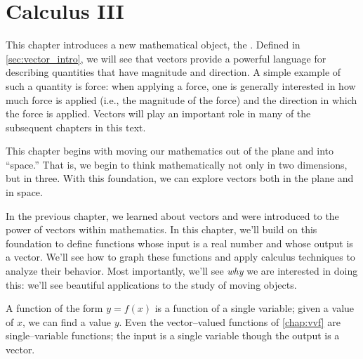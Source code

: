 \part{Calculus III}



This chapter introduces a new mathematical object, the . Defined in \autoref{sec:vector_intro}, we will see that vectors provide a powerful language for describing quantities that have magnitude and direction. A simple example of such a quantity is force: when applying a force, one is generally interested in how much force is applied (i.e., the magnitude of the force) and the direction in which the force is applied. Vectors will play an important role in many of the subsequent chapters in this text. 

This chapter begins with moving our mathematics out of the plane and into ``space.'' That is, we begin to think mathematically not only in two dimensions, but in three. With this foundation, we can explore vectors both in the plane and in space. 







%



In the previous chapter, we learned about vectors and were introduced to the power of vectors within mathematics. In this chapter, we'll build on this foundation to define functions whose input is a real number and whose output is a vector. We'll see how to graph these functions and apply calculus techniques to analyze their behavior. Most importantly, we'll see \textit{why} we are interested in doing this: we'll see beautiful applications to the study of moving objects.









A function of the form $y=f(x)$ is a function of a single variable; given a value of $x$, we can find a value $y$. Even the vector--valued functions of \autoref{chap:vvf} are single--variable functions; the input is a single variable though the output is a vector.

